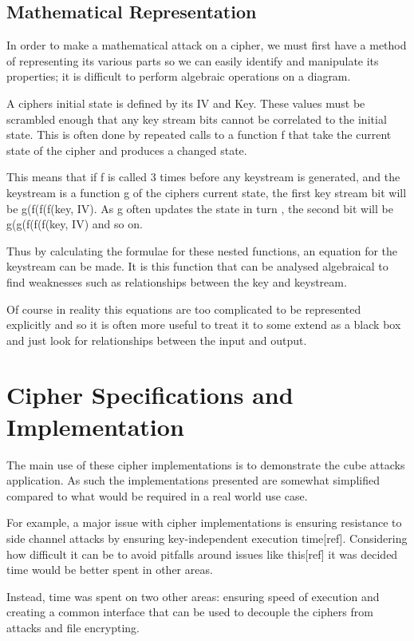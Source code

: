\documentclass{report}
\let\Oldsection\section
\renewcommand{\section}{\FloatBarrier\Oldsection}
\begin{document}

\section{Mathematical Representation}
In order to make a mathematical attack on a cipher, we must first have a method
of representing its various parts so we can easily identify and manipulate its properties; it is difficult to perform algebraic operations on a diagram.

A ciphers initial state is defined by its IV and Key. These values must be scrambled enough that any key stream bits cannot be correlated to the initial state. This is often done by repeated calls to a function f that take the current state of the cipher and produces a changed state.

This means that if f is called 3 times before any keystream is generated, and the keystream is a function g of the ciphers current state, the first key stream bit will be g(f(f(f(key, IV). As g often updates the state in turn , the second bit will be g(g(f(f(f(key, IV) and so on.

Thus by calculating the formulae for these nested functions, an equation for the keystream can be made. It is this function that can be analysed algebraical to find weaknesses such as relationships between the key and keystream.


Of course in reality this equations are too complicated to be represented explicitly and so it is often more useful to treat it to some extend as a black box and just look for relationships between the input and output.
\chapter{Cipher Specifications  and Implementation}
The main use of these cipher implementations is to demonstrate the cube attacks application. As such the implementations presented are somewhat simplified compared to what would be required in a real world use case.

For example, a major issue with cipher implementations is ensuring resistance to side channel attacks by ensuring key-independent execution time[ref]. Considering how difficult it can be to avoid pitfalls around issues like this[ref] it was decided time would be better spent in other areas.

Instead, time was spent on two other areas: ensuring speed of execution and creating a common interface that can be used to decouple the ciphers from attacks and file encrypting.
\end{document}
